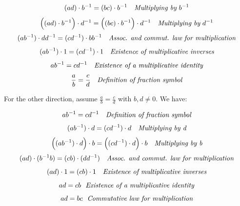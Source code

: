 \documentclass{article}
\begin{document}
\begin{equation*}
	(ad) \cdot b^{-1} = (bc) \cdot b^{-1} \ \ \ \emph{Multiplying by} \ b^{-1}
\end{equation*}
\begin{equation*}
	\Big((ad) \cdot b^{-1}\Big) \cdot d^{-1} = \Big((bc) \cdot b^{-1}\Big) \cdot d^{-1} \ \ \ \emph{Multiplying by} \ d^{-1}
\end{equation*}
\begin{equation*}
	(ab^{-1}) \cdot dd^{-1} = (cd^{-1}) \cdot bb^{-1} \ \ \ \emph{Assoc. and commut. law for multiplication}
\end{equation*}
\begin{equation*}
	(ab^{-1}) \cdot 1 = (cd^{-1}) \cdot 1 \ \ \ \emph{Existence of multiplicative inverses}
\end{equation*}
\begin{equation*}
	ab^{-1}  = cd^{-1} \ \ \ \emph{Existence of a multiplicative identity}
\end{equation*}
\begin{equation*}
	\frac{a}{b} = \frac{c}{d} \ \ \ \emph{Definition of fraction symbol}
\end{equation*}

For the other direction, assume \(\frac{a}{b} = \frac{c}{d}\) with \(b, d \neq 0\). We have:

\begin{equation*}
	ab^{-1} = cd^{-1} \ \ \ \emph{Definition of fraction symbol}
\end{equation*}
\begin{equation*}
	(ab^{-1}) \cdot d = (cd^{-1}) \cdot d \ \ \ \emph{Multiplying by d}
\end{equation*}
\begin{equation*}
	\Big((ab^{-1}) \cdot d\Big) \cdot b = \Big((cd^{-1}) \cdot d\Big) \cdot b \ \ \ \emph{Multiplying by b}
\end{equation*}
\begin{equation*}
	(ad) \cdot (b^{-1}b) = (cb) \cdot (dd^{-1}) \ \ \ \emph{Assoc. and commut. law for multiplication}
\end{equation*}
\begin{equation*}
	(ad) \cdot 1 = (cb) \cdot 1 \ \ \ \emph{Existence of multiplicative inverses}
\end{equation*}
\begin{equation*}
	ad = cb  \ \ \emph{Existence of a multiplicative identity}
\end{equation*}
\begin{equation*}
	ad = bc  \ \ \emph{Commutative law for multiplication}
\end{equation*}
\end{document}
